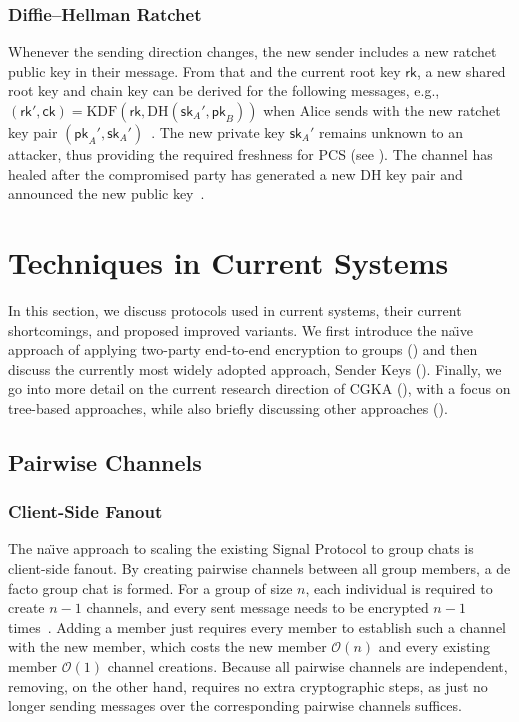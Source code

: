 \documentclass[conference]{IEEEtran}
\begin{document}
\subsubsection{Diffie--Hellman Ratchet}\label{sec:dh-ratchet}
Whenever the sending direction changes, the new sender includes a new ratchet public key in their message.
From that and the current root key $\mathsf{rk}$, a new shared root key and chain key can be derived for the following messages, e.g., $(\mathsf{rk}', \mathsf{ck}) = \mathrm{KDF}(\mathsf{rk}, \mathrm{DH}(\mathsf{sk}_A', \mathsf{pk}_B))$ when Alice sends with the new ratchet key pair $(\mathsf{pk}_A', \mathsf{sk}_A')$~\cite{perrinDoubleRatchetAlgorithm}.
The new private key $\mathsf{sk}_A'$ remains unknown to an attacker, thus providing the required freshness for \ac{PCS} (see ).
The channel has healed after the compromised party has generated a new \ac{DH} key pair and announced the new public key~\cite{perrinDoubleRatchetAlgorithm}.

\section{Techniques in Current Systems}\label{sec:techniques}
In this section, we discuss protocols used in current systems, their current shortcomings, and proposed improved variants.
We first introduce the na\"{\i}ve approach of applying two-party end-to-end encryption to groups () and then discuss the currently most widely adopted approach, Sender Keys ().
Finally, we go into more detail on the current research direction of \ac{CGKA} (), with a focus on tree-based approaches, while also briefly discussing other approaches ().

\subsection{Pairwise Channels}
\subsubsection{Client-Side Fanout}\label{sec:fanout}
The na\"{\i}ve approach to scaling the existing Signal Protocol to group chats is client-side fanout.
By creating pairwise channels between all group members, a de facto group chat is formed.
For a group of size $n$, each individual is required to create $n-1$ channels, and every sent message needs to be encrypted $n-1$ times~\cite{cohn-gordonEndstoEndsEncryptionAsynchronous2018}.
Adding a member just requires every member to establish such a channel with the new member, which costs the new member $\mathcal{O}(n)$ and every existing member $\mathcal{O}(1)$ channel creations.
Because all pairwise channels are independent, removing, on the other hand, requires no extra cryptographic steps, as just no longer sending messages over the corresponding pairwise channels suffices.
\end{document}
